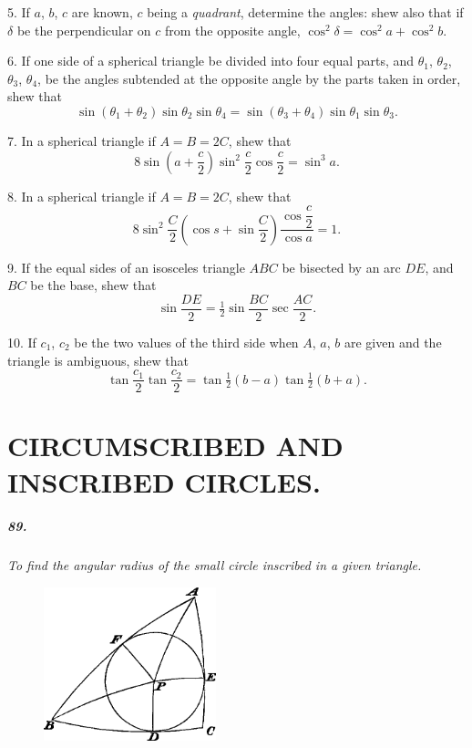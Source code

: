 \documentclass{book}[2004/02/16]
\begin{document}
\begin{mainmatter}
\begin{spacing}{1.3}
5. If $a$, $b$, $c$ are known, $c$ being a \textit{quadrant}, determine the
angles: shew also that if $\delta$ be the perpendicular on $c$ from the
opposite angle, $\cos^2 \delta = \cos^2 a + \cos^2 b$.
\medskip

6. If one side of a spherical triangle be divided into four
equal parts, and $\theta_1$, $\theta_2$, $\theta_3$, $\theta_4$, be the angles subtended at the opposite
angle by the parts taken in order, shew that
\[
\sin(\theta_1 + \theta_2) \sin \theta_2 \sin\theta_4 = \sin(\theta_3 + \theta_4) \sin\theta_1 \sin\theta_3.
\]

7. In a spherical triangle if $A = B = 2C$, shew that
\[
8 \sin\left(a + \dfrac{c}{2}\right) \sin^2 \dfrac{c}{2} \cos \dfrac{c}{2} = \sin^3 a.
\]

8. In a spherical triangle if $A = B = 2C$, shew that
\[
8 \sin^2 \dfrac{C}{2} \left(\cos s + \sin \dfrac{C}{2}\right)
\dfrac{\cos\dfrac{c}{2}}{\cos a} = 1.
\]

9. If the equal sides of an isosceles triangle $ABC$ be bisected
by an arc $DE$, and $BC$ be the base, shew that
\[
\sin \dfrac{DE}{2} = \tfrac{1}{2} \sin \dfrac{BC}{2} \sec \dfrac{AC}{2}.
\]

10. If $c_1$, $c_2$ be the two values of the third side when $A$, $a$, $b$
are given and the triangle is ambiguous, shew that
\[
  \tan \dfrac{c_1}{2} \tan \dfrac{c_2}{2}
= \tan \tfrac{1}{2} (b - a) \tan \tfrac{1}{2} (b + a).
\]

\chapter[Circumscribed and Inscribed Circles.]{CIRCUMSCRIBED AND INSCRIBED CIRCLES.}

\paragraph{89.} \textit{To find the angular radius of the small circle inscribed
in a given triangle.}
\begin{figure}[htp]
\centering
\includegraphics[width=5.0cm]{images/069fc}
\end{figure}


\end{spacing}
\end{mainmatter}
\end{document}
